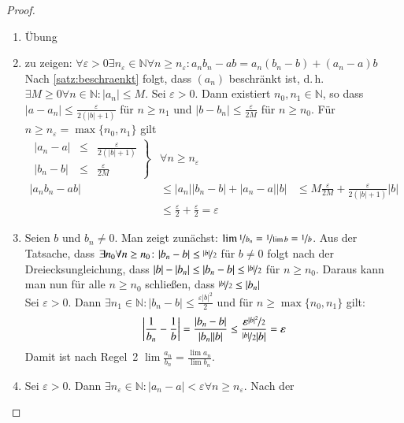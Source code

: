 \documentclass[ngerman,titlepage,twoside, parskip=half*]{scrreprt}
\newcommand*{\N}{\mathbb{N}}
\theoremstyle{plain}
\theoremstyle{definition}
\theoremstyle{remark}
\newcommand*{\abs}[2][]{#1\lvert#2#1\rvert}
\begin{document}
\begin{proof}
\begin{enumerate}
\item Übung
\item zu zeigen: $\forall \varepsilon >0 \exists n_{\varepsilon}
  \in \N\forall n \geq n_{\varepsilon}\colon a_nb_n-ab=a_n(b_n-b)+(a_n-a)b$\\
  Nach \autoref{satz:beschraenkt} folgt, dass $(a_n)$ beschränkt ist,
  d.\,h. $\exists M \geq 0 \forall n \in \N\colon \abs{a_n} \leq M$. Sei
  $\varepsilon > 0$. Dann existiert $n_0,n_1 \in \N$, so dass $\abs{a-a_n}
  \leq \frac{\varepsilon}{2(\abs{b}+1)}$ für $n \geq n_1$ und $\abs{b-b_n}
  \leq \frac{\varepsilon}{2M}$ für $n \geq n_0$. Für $n \geq
  n_{\varepsilon} = \max \{n_0,n_1\}$ gilt
  \begin{align*}
    \left.
      \begin{array}{rcl}
        \abs{a_n-a} & \leq & \frac{\varepsilon}{2(\abs{b}+1)}\\
        \abs{b_n-b} & \leq & \frac{\varepsilon}{2M}
      \end{array}
    \right\}&
    \forall n \geq n_{\varepsilon}\\
    \abs{a_nb_n-ab} & \leq \abs{a_n}\abs{b_n-b}+\abs{a_n-a}\abs{b} &\leq M
    \frac{\varepsilon}{2M}+\frac{\varepsilon}{2(\abs{b}+1)}\abs{b}\\
    & \leq \frac{\varepsilon}{2}+\frac{\varepsilon}{2}=\varepsilon
  \end{align*}
\item Seien $b$ und $ b_n \neq 0$. Man zeigt zunächst: $\lim
  \nicefrac{1}{b_n}=\nicefrac{1}{\lim b}=\nicefrac{1}{b}$. Aus der
  Tatsache, dass $\exists n_0 \forall n \geq n_0 \colon \abs{b_n-b}\leq
  \nicefrac{\abs{b}}{2}$ für $b\neq 0$ folgt nach der Dreiecksungleichung,
  dass $\abs{b}-\abs{b_n} \leq \abs{b_n-b} \leq \nicefrac{\abs{b}}{2}$ für $n \geq
  n_0$. Daraus kann man nun für alle $n\geq n_0$ schließen, dass
  $\nicefrac{\abs{b}}{2} \leq \abs{b_n}$\\
  Sei $\varepsilon > 0$. Dann $\exists n_1 \in \N \colon \abs{b_n-b} \leq
  \frac{\varepsilon \abs{b}^2}{2}$ und für $n \geq \max \{n_0,n_1\}$
  gilt:
  \[\left\lvert\frac{1}{b_n}-\frac{1}{b}\right\rvert
  =\frac{\abs{b_n-b}}{\abs{b_n}\abs{b}}\leq
  \frac{\varepsilon
    \nicefrac{\abs{b}^2}{2}}{\nicefrac{\abs{b}}{2}\abs{b}}=\varepsilon\]
  Damit ist nach Regel~2 $\lim \frac{a_n}{b_n}=\frac{\lim a_n}{\lim b_n}$.
\item Sei $\varepsilon > 0$. Dann $\exists n_{\varepsilon} \in
  \N\colon\abs{a_n-a}< \varepsilon \forall n \geq n_{\varepsilon}$. Nach der

\end{enumerate}
\end{proof}
\end{document}
